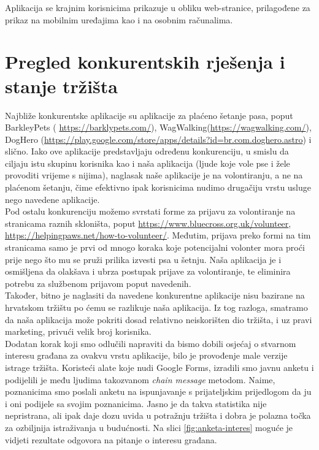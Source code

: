         \noindent Aplikacija se krajnim korisnicima prikazuje u obliku web-stranice, prilagođene za prikaz na mobilnim uređajima kao i na osobnim računalima.
        
    \section{Pregled konkurentskih rješenja i stanje tržišta}
    
        Najbliže konkurentske aplikacije su aplikacije za plaćeno šetanje pasa, poput BarkleyPets ( \url{https://barklypets.com/}), WagWalking(\url{https://wagwalking.com/}), DogHero (\url{https://play.google.com/store/apps/details?id=br.com.doghero.astro}) i slično. Iako ove aplikacije predstavljaju određenu konkurenciju, u smislu da ciljaju istu skupinu korisnika kao i naša aplikacija (ljude koje vole pse i žele provoditi vrijeme s nijima), naglasak naše aplikacije je na volontiranju, a ne na plaćenom šetanju, čime efektivno ipak korisnicima nudimo drugačiju vrstu usluge nego navedene aplikacije. \\
        
        \noindent Pod ostalu konkurenciju možemo svrstati forme za prijavu za volontiranje na stranicama raznih skloništa, poput \url{https://www.bluecross.org.uk/volunteer},  \url{https://helpingpaws.net/how-to-volunteer/}. Međutim, prijava preko formi na tim stranicama samo je prvi od mnogo koraka koje potencijalni volonter mora proći prije nego što mu se pruži prilika izvesti psa u šetnju. Naša aplikacija je i osmišljena da olakšava i ubrza postupak prijave za volontiranje, te eliminira potrebu za službenom prijavom poput navedenih. \\
        
        \noindent Također, bitno je naglasiti da navedene konkurentne aplikacije nisu bazirane na hrvatskom tržištu po ćemu se razlikuje naša aplikacija. Iz tog razloga, smatramo da naša aplikacija može pokriti dosad relativno neiskorišten dio tržišta, i uz pravi marketing, privući velik broj korisnika. \\
		
		 \noindent Dodatan korak koji smo odlučili napraviti da bismo dobili osjećaj o stvarnom interesu građana za ovakvu vrstu aplikacije, bilo je provođenje male verzije istrage tržišta. Koristeći alate koje nudi Google Forms, izradili smo javnu anketu i podijelili je među ljudima takozvanom \textit{chain message} metodom. Naime, poznanicima smo poslali anketu na ispunjavanje s prijateljskim prijedlogom da ju i oni podijele sa svojim poznanicima. Jasno je da takva statistika nije nepristrana, ali ipak daje dozu uvida u potražnju tržišta i dobra je polazna točka za ozbiljnija istraživanja u budućnosti. Na slici \ref{fig:anketa-interes} moguće je vidjeti rezultate odgovora na pitanje o interesu građana. 
        

